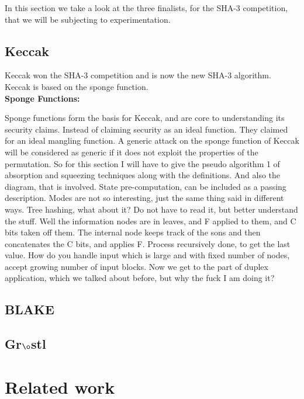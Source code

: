 \documentclass[12pt]{artikel3}                  %
\begin{document}
In this section we take a look at the three finalists, for the SHA-3 competition, that we will be subjecting to
experimentation.

  \subsection{Keccak}
  Keccak won the SHA-3 competition and is now the new SHA-3 algorithm. Keccak is based on the sponge function.\cite{00015}
  \\

  {\bf Sponge Functions:} \cite{00016}

  Sponge functions form the basis for Keccak, and are core to understanding its security claims. Instead of claiming 
  security as an ideal function. They claimed for an ideal mangling function. A generic attack on the sponge function 
  of Keccak will be considered as generic if it does not exploit the properties of the permutation. So for this section
  I will have to give the pseudo algorithm 1 of absorption and squeezing techniques along with the definitions. And also
  the diagram, that is involved. State pre-computation, can be included as a passing description. Modes are not so 
  interesting, just the same thing said in different ways. Tree hashing, what about it? Do not have to read it, but better
  understand the stuff. Well the information nodes are in leaves, and F applied to them, and C bits taken off them. The
  internal node keeps track of the sons and then concatenates the C bits, and applies F. Process recursively done, to get
  the last value. How do you handle input which is large and with fixed number of nodes, accept growing number of input blocks.
  Now we get to the part of duplex application, which we talked about before, but why the fuck I am doing it? 

  \subsection{BLAKE}
  \subsection{Gr$\o$stl}

\section{Related work}

\end{document}
